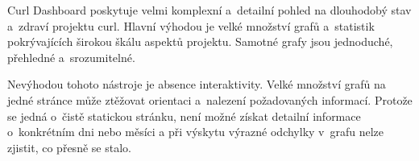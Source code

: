 Curl Dashboard poskytuje velmi komplexní a~detailní pohled na dlouhodobý stav a~zdraví projektu curl. Hlavní výhodou je velké množství grafů a~statistik pokrývajících širokou škálu aspektů projektu. Samotné grafy jsou jednoduché, přehledné a~srozumitelné.

Nevýhodou tohoto nástroje je absence interaktivity. Velké množství grafů na jedné stránce může ztěžovat orientaci a~nalezení požadovaných informací. Protože se jedná o~čistě statickou stránku, není možné získat detailní informace o~konkrétním dni nebo měsíci a při výskytu výrazné odchylky v~grafu nelze zjistit, co přesně se stalo.
